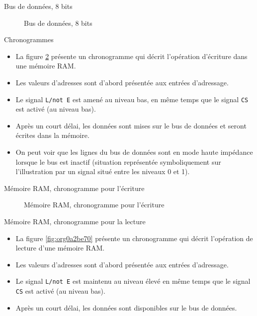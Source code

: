 \documentclass[presentation]{beamer}
\begin{document}
\begin{frame}[label={sec:orgeaf2029}]{Bus de données, 8 bits}
\begin{figure}[htbp]
\centering

\caption{\label{fig:org232c257}Bus de données, 8 bits}
\end{figure}
\end{frame}

\begin{frame}[label={sec:orgd8faa9b},fragile]{Chronogrammes}
 \begin{itemize}
\item La figure \ref{fig:orgd051d75} présente un chronogramme qui décrit l'opération d'écriture dans une mémoire RAM.

\item Les valeurs d'adresses sont d'abord présentée aux entrées d'adressage.

\item Le signal \texttt{L/not E} est amené au niveau bas, en même temps que le signal \texttt{CS} est activé (au niveau bas).

\item Après un court délai, les données sont mises sur le bus de données et seront écrites dans la mémoire.

\item On peut voir que les lignes du bus de données sont en mode \alert{haute impédance} lorsque le bus est inactif (situation représentée symboliquement sur l'illustration par un signal situé entre les niveaux 0 et 1).
\end{itemize}
\end{frame}

\begin{frame}[label={sec:org5cce603}]{Mémoire RAM, chronogramme pour l'écriture}
\begin{figure}[htbp]
\centering

\caption{\label{fig:orgd051d75}Mémoire RAM, chronogramme pour l'écriture}
\end{figure}
\end{frame}

\begin{frame}[label={sec:orgf6a0748},fragile]{Mémoire RAM, chronogramme pour la lecture}
 \begin{itemize}
\item La figure \ref{fig:org0a2be70} présente un chronogramme qui décrit l'opération de lecture d'une mémoire RAM.

\item Les valeurs d'adresses sont d'abord présentée aux entrées d'adressage.

\item Le signal \texttt{L/not E} est maintenu au niveau élevé en même temps que le signal \texttt{CS} est activé (au niveau bas).

\item Après un court délai, les données sont disponibles sur le bus de données.
\end{itemize}
\end{frame}
\end{document}

